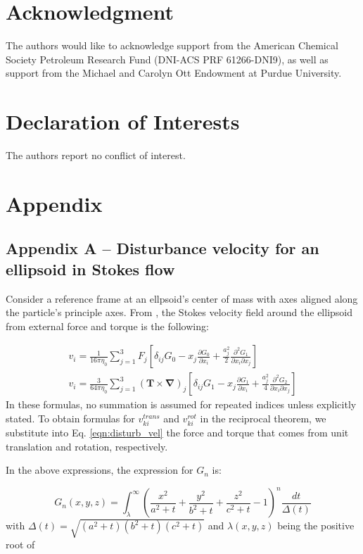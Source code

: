 \documentclass{jfm}
\begin{document}
\section*{Acknowledgment}
The authors would like to acknowledge support from the American Chemical Society Petroleum Research Fund (DNI-ACS PRF 61266-DNI9), as well as support from the Michael and Carolyn Ott Endowment at Purdue University.

\section*{Declaration of Interests}
The authors report no conflict of interest.

\section{Appendix}
\subsection{Appendix A -- Disturbance velocity for an ellipsoid in Stokes flow}
Consider a reference frame at an ellpsoid’s center of mass with axes aligned along the particle’s principle axes.  From \citep[pg.~55]{KimKarilla2005}, the Stokes velocity field around the ellipsoid from external force and torque is the following:

 \begin{subequations} \label{eqn:disturb_vel}
\begin{align}
    v_{i} = \frac{1}{16\pi\eta_0} \sum_{j=1}^3 F_j \left[ \delta_{ij} G_0 - x_j \frac{\partial G_0}{\partial x_i} + \frac{a_j^2}{2} \frac{\partial^2 G_1}{\partial x_i \partial x_j}\right] \\
    v_{i} = \frac{3}{64\pi\eta_0} \sum_{j=1}^3 \left(\boldsymbol{T\times \nabla}\right)_j \left[ \delta_{ij} G_1 - x_j \frac{\partial G_1}{\partial x_i} + \frac{a_j^2}{4} \frac{\partial^2 G_2}{\partial x_i \partial x_j}\right]
\end{align}
\end{subequations}
In these formulas, no summation is assumed for repeated indices unless explicitly stated.  To obtain formulas for $v_{ki}^{trans}$ and $v_{ki}^{rot}$ in the reciprocal theorem, we substitute into Eq. \eqref{eqn:disturb_vel} the force and torque that comes from unit translation and rotation, respectively.

In the above expressions, the expression for $G_n$ is:

\begin{equation}
    G_n(x,y,z) = \int_{\lambda}^{\infty} \left( \frac{x^2}{a^2 + t} + \frac{y^2}{b^2 + t}  + \frac{z^2}{c^2 + t} - 1 \right)^n \frac{dt}{\Delta(t)}
\end{equation}
with $\Delta(t) = \sqrt{(a^2 + t)(b^2 + t)(c^2 + t)}$ and $\lambda(x,y,z)$ being the positive root of 
\end{document}
